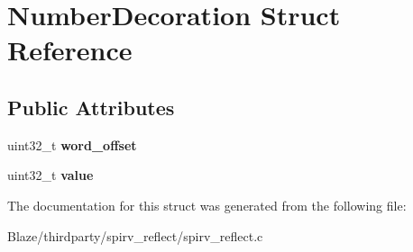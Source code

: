 \hypertarget{structNumberDecoration}{}\section{Number\+Decoration Struct Reference}
\label{structNumberDecoration}
\subsection*{Public Attributes}
\begin{DoxyCompactItemize}
\item 
\mbox{\label{structNumberDecoration_a841f01a14c788ef37b1049564a5f7b4e}} 
uint32\+\_\+t {\bfseries word\+\_\+offset}
\item 
\mbox{\label{structNumberDecoration_a65d91b94284e457acac7774730565bae}} 
uint32\+\_\+t {\bfseries value}
\end{DoxyCompactItemize}


The documentation for this struct was generated from the following file\+:\begin{DoxyCompactItemize}
\item 
Blaze/thirdparty/spirv\+\_\+reflect/spirv\+\_\+reflect.\+c\end{DoxyCompactItemize}
